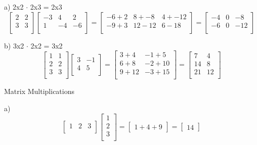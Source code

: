 \documentclass[12pt]{article}
\newcommand{\sqbrl}{\left[}
\newcommand{\sqbrr}{\right]}
\newenvironment{problem}[2][Problem]{\begin{trivlist}
\item[\hskip \labelsep {\bfseries #1}\hskip \labelsep {\bfseries #2.}]}{\end{trivlist}}
\begin{document}
a) 2x2 $\cdot$ 2x3 = 2x3\\
	\[\sqbrl\begin{matrix}2 & 2\\3 & 3\\\end{matrix}\sqbrr\sqbrl\begin{matrix}-3 & 4 & 2\\1 & -4 & -6\\\end{matrix}\sqbrr
	=\sqbrl\begin{matrix}-6 + 2 & 8 + -8 & 4 + -12\\-9 + 3 & 12 - 12 & 6 -18\\\end{matrix}\sqbrr
	=\sqbrl\begin{matrix}-4 & 0 & -8\\-6 & 0 & -12\\\end{matrix}\sqbrr\]
 
b) 3x2 $\cdot$ 2x2 = 3x2\\
	\[\sqbrl\begin{matrix}1 & 1\\2 & 2\\3 & 3\\\end{matrix}\sqbrr\sqbrl\begin{matrix}3 & -1\\4 & 5\\\end{matrix}\sqbrr
	=\sqbrl\begin{matrix}3 + 4 & -1 + 5\\6+8 & -2 + 10\\ 9 + 12 & -3 + 15\\\end{matrix}\sqbrr
	=\sqbrl\begin{matrix}7 & 4\\14 & 8\\21 & 12\\\end{matrix}\sqbrr\]
 
 \begin{problem}{3}
 	Matrix Multiplications
 \end{problem}
 
a)\\
 	\[\sqbrl\begin{matrix}1 & 2 & 3\\\end{matrix}\sqbrr\sqbrl\begin{matrix}1\\2\\3\\\end{matrix}\sqbrr
 	=\sqbrl\begin{matrix}1 + 4+ 9\end{matrix}\sqbrr
 	=\sqbrl\begin{matrix}14\end{matrix}\sqbrr\]
 	
\end{document}
